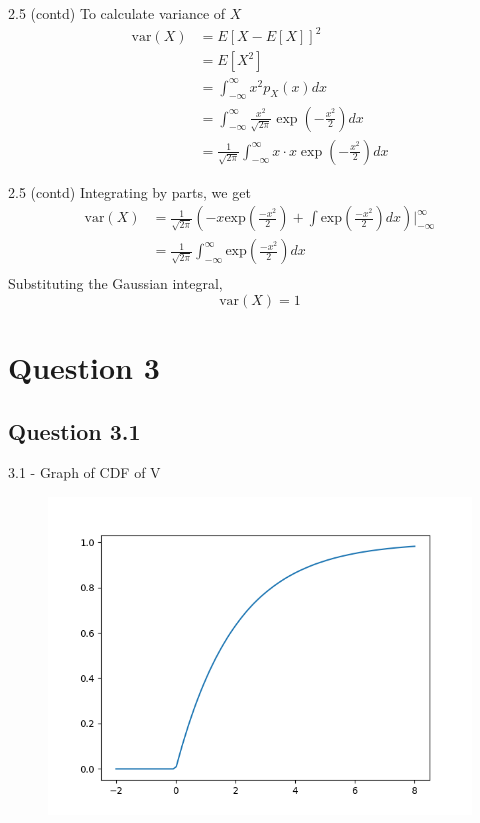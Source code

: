 \documentclass{beamer}
\begin{document}
\begin{frame}{2.5 (contd)}
    To calculate variance of $X$
    \begin{align}
        \text{var}(X) &= E\left[X - E[X]\right]^2 \\
        &= E\left[X^2\right] \\
        &= \int_{-\infty}^{\infty}{x^2 p_X(x) dx} \\
        &= \int_{-\infty}^{\infty}{\frac{x^2}{\sqrt{2 \pi}} \exp\left(-\frac{x^2}{2}\right) dx} \\
        &= \frac{1}{\sqrt{2 \pi}} \int_{-\infty}^{\infty}{x \cdot x \exp\left(-\frac{x^2}{2}\right) dx}
    \end{align}
\end{frame}

\begin{frame}{2.5 (contd)}
    Integrating by parts, we get
    \begin{align}
        \text{var}(X) &= \frac{1}{\sqrt{2 \pi}}\left(-x \text{exp}\left(\frac{-x^2}{2}\right) + \int{\text{exp}\left(\frac{-x^2}{2}\right) dx}\right) \Bigg|_{-\infty}^{\infty} \\
        &= \frac{1}{\sqrt{2 \pi}} \int_{-\infty}^{\infty}{\text{exp}\left(\frac{-x^2}{2}\right) dx} \\
    \end{align}
    Substituting the Gaussian integral,
    \begin{equation}
        \text{var}(X) = 1
    \end{equation}
\end{frame}

\section{Question 3}
\subsection{Question 3.1}
\begin{frame}{3.1 - Graph of CDF of V}
    \begin{figure}[!ht]
        \includegraphics[width=\textheight]{figs/cdf_v.png}
    \end{figure}
\end{frame}
\end{document}

